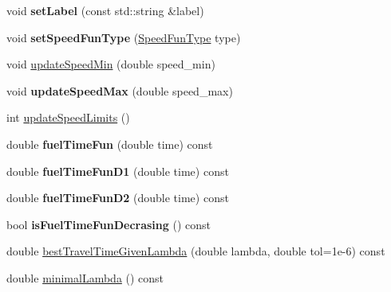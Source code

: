 \begin{DoxyCompactItemize}
\item 
\hypertarget{class_p_a_s_o_edge_data_a94843c7aefca24491f4971743712ad87}{}void {\bfseries set\+Label} (const std\+::string \&label)\label{class_p_a_s_o_edge_data_a94843c7aefca24491f4971743712ad87}

\item 
\hypertarget{class_p_a_s_o_edge_data_a96054f6e27a6436d0a80769dead7ad0a}{}void {\bfseries set\+Speed\+Fun\+Type} (\hyperlink{class_p_a_s_o_edge_data_a30164e651874b10a410d96616c7b4077}{Speed\+Fun\+Type} type)\label{class_p_a_s_o_edge_data_a96054f6e27a6436d0a80769dead7ad0a}

\item 
void \hyperlink{class_p_a_s_o_edge_data_ac3c5004b5ee8c3b8fe00e1f0da1173a5}{update\+Speed\+Min} (double speed\+\_\+min)
\item 
\hypertarget{class_p_a_s_o_edge_data_a9ecb8f56043053e2e2b615fb641c24f9}{}void {\bfseries update\+Speed\+Max} (double speed\+\_\+max)\label{class_p_a_s_o_edge_data_a9ecb8f56043053e2e2b615fb641c24f9}

\item 
int \hyperlink{class_p_a_s_o_edge_data_a09620b5e4c9df047eb40d5f4e1c23ad6}{update\+Speed\+Limits} ()
\item 
\hypertarget{class_p_a_s_o_edge_data_a5dbaa50a051fa44182229166745f8e7e}{}double {\bfseries fuel\+Time\+Fun} (double time) const \label{class_p_a_s_o_edge_data_a5dbaa50a051fa44182229166745f8e7e}

\item 
\hypertarget{class_p_a_s_o_edge_data_ad75d5d673560b8a1f1f5dc6c34dc191f}{}double {\bfseries fuel\+Time\+Fun\+D1} (double time) const \label{class_p_a_s_o_edge_data_ad75d5d673560b8a1f1f5dc6c34dc191f}

\item 
\hypertarget{class_p_a_s_o_edge_data_a85c4562febdd71335964dd477782ffe7}{}double {\bfseries fuel\+Time\+Fun\+D2} (double time) const \label{class_p_a_s_o_edge_data_a85c4562febdd71335964dd477782ffe7}

\item 
\hypertarget{class_p_a_s_o_edge_data_a72ad7aa1c5caac0aef125a4897bd105a}{}bool {\bfseries is\+Fuel\+Time\+Fun\+Decrasing} () const \label{class_p_a_s_o_edge_data_a72ad7aa1c5caac0aef125a4897bd105a}

\item 
double \hyperlink{class_p_a_s_o_edge_data_a1b40294da7d141e2f0be57ca01bc52a3}{best\+Travel\+Time\+Given\+Lambda} (double lambda, double tol=1e-\/6) const 
\item 
\hypertarget{class_p_a_s_o_edge_data_a5717beb094e48b7fd487b9848f3838c9}{}double \hyperlink{class_p_a_s_o_edge_data_a5717beb094e48b7fd487b9848f3838c9}{minimal\+Lambda} () const \label{class_p_a_s_o_edge_data_a5717beb094e48b7fd487b9848f3838c9}


\end{DoxyCompactItemize}
